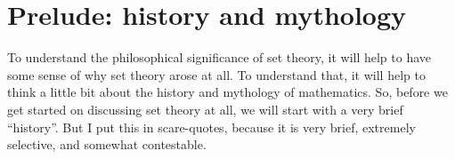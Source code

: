 \documentclass[../../../include/open-logic-chapter]{subfiles}
\begin{document}
	
\setcounter{chapter}{-1} 

\chapter{Prelude: history and mythology}\label{ch:History}
To understand the philosophical significance of set theory, it will help to have some sense of why set theory arose at all. To understand that, it will help to think a little bit about the history and mythology of mathematics. So, before we get started on discussing set theory at all, we will start with a very brief ``history''. But I put this in scare-quotes, because it is very brief, extremely selective, and somewhat contestable.

\end{document}
